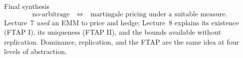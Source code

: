 \documentclass[10pt]{article}
\newcommand{\1}{\mathbf 1}
\theoremstyle{definition}
\begin{document}
\begin{keyidea}{Final synthesis}
\[
\boxed{
\text{no-arbitrage}
\quad\Longleftrightarrow\quad
\text{martingale pricing under a suitable measure.}}
\]
Lecture~7 \emph{used} an EMM to price and hedge; Lecture~8 explains its
existence (FTAP I), its uniqueness (FTAP II), and the bounds available without
replication. Dominance, replication, and the FTAP are the same idea at four
levels of abstraction.
\end{keyidea}
\end{document}
